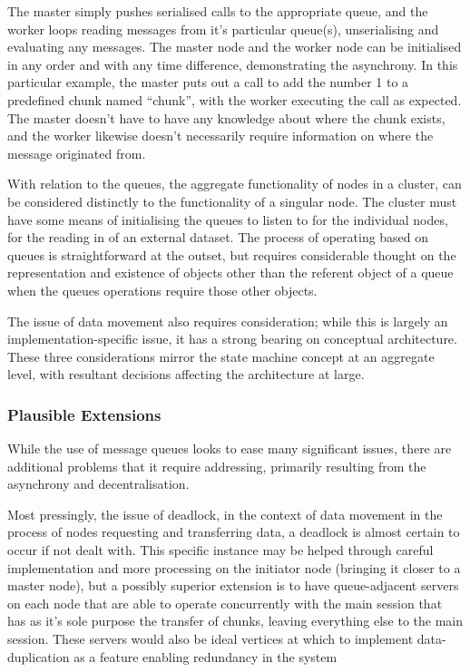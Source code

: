 The master simply pushes serialised calls to the appropriate queue, and
the worker loops reading messages from it's particular queue(s),
unserialising and evaluating any messages. The master node and the
worker node can be initialised in any order and with any time
difference, demonstrating the asynchrony. In this particular example,
the master puts out a call to add the number 1 to a predefined chunk
named ``chunk'', with the worker executing the call as expected. The
master doesn't have to have any knowledge about where the chunk exists,
and the worker likewise doesn't necessarily require information on where
the message originated from.

With relation to the queues, the aggregate functionality of nodes in a
cluster, can be considered distinctly to the functionality of a singular
node. The cluster must have some means of initialising the queues to
listen to for the individual nodes, for the reading in of an external
dataset. The process of operating based on queues is straightforward at
the outset, but requires considerable thought on the representation and
existence of objects other than the referent object of a queue when the
queues operations require those other objects.

The issue of data movement also requires consideration; while this is
largely an implementation-specific issue, it has a strong bearing on
conceptual architecture. These three considerations mirror the state
machine concept at an aggregate level, with resultant decisions
affecting the architecture at large.

\hypertarget{plausible-extensions}{%
\subsubsection{Plausible Extensions}\label{plausible-extensions}}

While the use of message queues looks to ease many significant issues,
there are additional problems that it require addressing, primarily
resulting from the asynchrony and decentralisation.

Most pressingly, the issue of deadlock, in the context of data movement
in the process of nodes requesting and transferring data, a deadlock is
almost certain to occur if not dealt with. This specific instance may be
helped through careful implementation and more processing on the
initiator node (bringing it closer to a master node), but a possibly
superior extension is to have queue-adjacent servers on each node that
are able to operate concurrently with the main \R session that has as
it's sole purpose the transfer of chunks, leaving everything else to the
main \R session. These servers would also be ideal vertices at which to
implement data-duplication as a feature enabling redundancy in the
system

